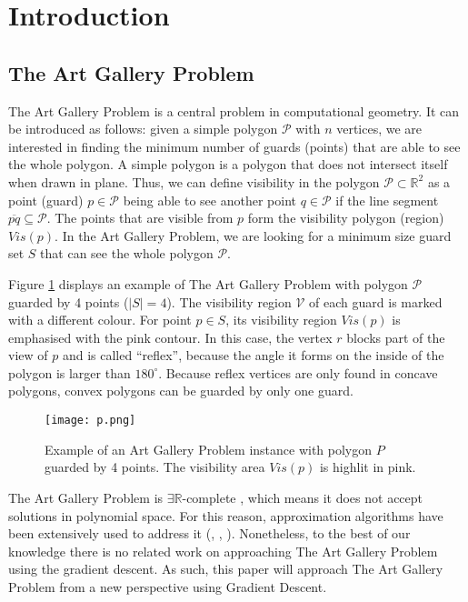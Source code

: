 \section{Introduction}
\subsection{The Art Gallery Problem \cite{o1987art}}

The Art Gallery Problem \cite{o1987art} is a central problem in computational geometry. It can be introduced as follows: given a simple polygon $\mathcal P$ with $n$ vertices, we are interested in finding the minimum number of guards (points) that are able to see the whole polygon. A simple polygon is a polygon that does not intersect itself when drawn in plane. Thus, we can define visibility in the polygon $\mathcal P \subset \mathbb R^2$ as a point (guard) $p \in \mathcal P$ being able to see another point $q \in \mathcal P$ if the line segment $\overline{pq} \subseteq \mathcal P$. The points that are visible from $p$ form the visibility polygon (region) $Vis(p)$. In the Art Gallery Problem, we are looking for a minimum size guard set $S$ that can see the whole polygon $\mathcal P$.

Figure \ref{fig:art} displays an example of The Art Gallery Problem \cite{o1987art} with polygon $\mathcal P$ guarded by 4 points ($|S| = 4$). The visibility region $\mathcal V$ of each guard is marked with a different colour. For point $p \in S$, its visibility region $Vis(p)$ is emphasised with the pink contour. In this case, the vertex $r$ blocks part of the view of $p$ and is called ``reflex'', because the angle it forms on the inside of the polygon is larger than $180^\circ$. Because reflex vertices are only found in concave polygons, convex polygons can be guarded by only one guard.

\begin{figure}[h!]
    \centering
    \texttt{[image: p.png]}
    \caption{Example of an Art Gallery Problem instance with polygon $P$ guarded by 4 points. The visibility area $Vis(p)$ is highlit in pink.}
    \label{fig:art}
\end{figure}

The Art Gallery Problem \cite{o1987art} is $\exists \mathbb R$-complete \cite{abrahamsen2021art}, which means it does not accept solutions in polynomial space. For this reason, approximation algorithms have been extensively used to address it (\cite{DBLP:journals/corr/BonnetM16b}, \cite{GHOSH2010718}, \cite{DBLP:journals/corr/abs-2007-06920}). Nonetheless, to the best of our knowledge there is no related work on approaching The Art Gallery Problem \cite{o1987art} using the gradient descent. As such, this paper will approach The Art Gallery Problem \cite{o1987art} from a new perspective using Gradient Descent.

